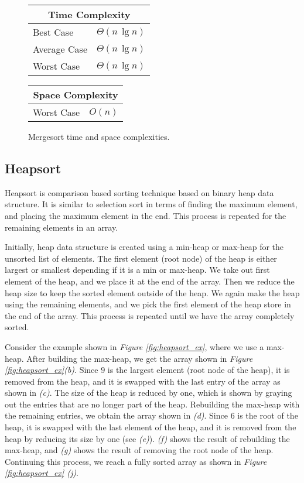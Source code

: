 \begin{figure}[!ht]
    \centering
    \begin{tabular}{l|l}
    \multicolumn{2}{c}{\textbf{Time Complexity}} \\
    \hline
    Best Case    & $\Theta(n \, \lg n)$ \\
    Average Case & $\Theta(n \, \lg n)$ \\
    Worst Case   & $\Theta(n \, \lg n)$ \\
    \end{tabular}
    \quad\quad
    \begin{tabular}{l|l}
    \multicolumn{2}{c}{\textbf{Space Complexity}} \\
    \hline
    Worst Case   & $O(n)$
    \end{tabular}
    
    \caption{Mergesort time\cite{clrs2009} and space complexities\cite{big-o}.}
    \label{fig:mergesort}
\end{figure}


\subsection{Heapsort}

Heapsort is comparison based sorting technique based on binary heap data structure. It is similar to selection sort in terms of finding the maximum element, and placing the maximum element in the end. This process is repeated for the remaining elements in an array. 

Initially, heap data structure is created using a min-heap or max-heap for the unsorted list of elements. The first element (root node) of the heap is either largest or smallest depending if it is a min or max-heap. We take out first element of the heap, and we place it at the end of the array. Then we reduce the heap size to keep the sorted element outside of the heap. We again make the heap using the remaining elements, and we pick the first element of the heap store in the end of the array. This process is repeated until we have the array completely sorted. 

Consider the example shown in \textit{Figure \ref{fig:heapsort_ex}}, where we use a max-heap. After building the max-heap, we get the array shown in \textit{Figure \ref{fig:heapsort_ex}(b)}. Since $9$ is the largest element (root node of the heap), it is removed from the heap, and it is swapped with the last entry of the array as shown in \textit{(c)}. The size of the heap is reduced by one, which is shown by graying out the entries that are no longer part of the heap. Rebuilding the max-heap with the remaining entries, we obtain the array shown in \textit{(d)}. Since $6$ is the root of the heap, it is swapped with the last element of the heap, and it is removed from the heap by reducing its size by one (see \textit{(e)}). \textit{(f)} shows the result of rebuilding the max-heap, and \textit{(g)} shows the result of removing the root node of the heap. Continuing this process, we reach a fully sorted array as shown in \textit{Figure \ref{fig:heapsort_ex} (j)}.

